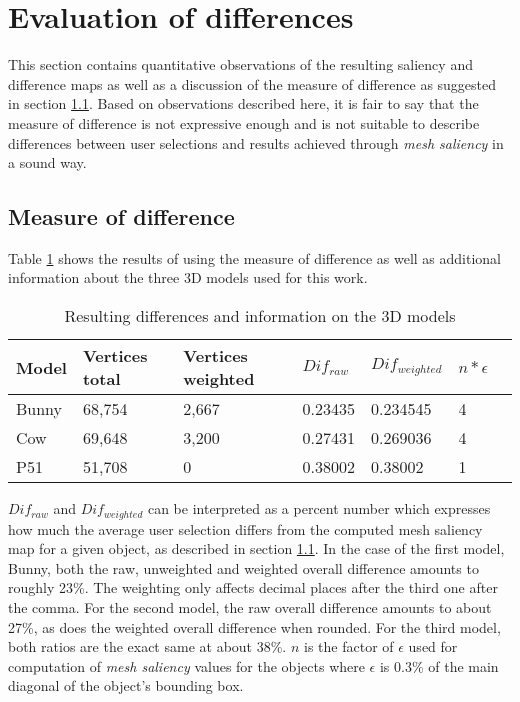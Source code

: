 	\section{Evaluation of differences}
	\label{sec:evaluation_of_differences}
This section contains quantitative observations of the resulting saliency and difference maps as well as a discussion of the measure of difference as suggested in section \ref{sec:measure_of_difference}. Based on observations described here, it is fair to say that the measure of difference is not expressive enough and is not suitable to describe differences between user selections and results achieved through \textit{mesh saliency} in a sound way.

		\subsection{Measure of difference}
		\label{sec:measure_of_difference}
Table \ref{tab:results_results_table} shows the results of using the measure of difference as well as additional information about the three 3D models used for this work.

\begin{table}[]
\begin{tabular}{l|llllll}
Model &	Vertices total &		Vertices weighted &	$Dif_{raw}$ &			$Dif_{weighted}$ &	$n*\epsilon$	\\ \hline
Bunny &	68,754 &			2,667 &			0.23435 &			0.234545 &		4			\\
Cow &	69,648 &			3,200 &			0.27431 &			0.269036 &		4			\\
P51 &	51,708 &			0 &			0.38002	&			0.38002 &		1				\\
\end{tabular}
\caption{Resulting differences and information on the 3D models}\label{tab:results_results_table}
\end{table}

$Dif_{raw}$ and $Dif_{weighted}$ can be interpreted as a percent number which expresses how much the average user selection differs from the computed mesh saliency map for a given object, as described in section \ref{sec:measure_of_difference}. In the case of the first model, Bunny, both the raw, unweighted and weighted overall difference amounts to roughly 23\%. The weighting only affects decimal places after the third one after the comma. For the second model, the raw overall difference amounts to about 27\%, as does the weighted overall difference when rounded. For the third model, both ratios are the exact same at about 38\%. $n$ is the factor of $\epsilon$ used for computation of \textit{mesh saliency} values for the objects where $\epsilon$ is 0.3\% of the main diagonal of the object's bounding box.

